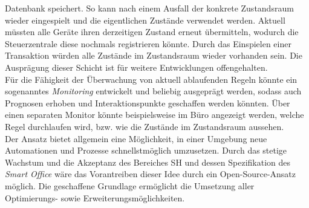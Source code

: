    Datenbank speichert. So kann nach einem Ausfall der konkrete Zustandsraum wieder eingespielt und die eigentlichen Zustände verwendet werden. Aktuell müssten alle Geräte ihren derzeitigen Zustand erneut übermitteln, wodurch 
    die Steuerzentrale diese nochmals registrieren könnte. Durch das Einspielen einer Transaktion würden alle Zustände im Zustandsraum wieder vorhanden sein. Die Ausprägung dieser Schicht ist für weitere Entwicklungen offengehalten. 
    \\
    \linebreak
    Für die Fähigkeit der Überwachung von aktuell ablaufenden Regeln könnte ein sogenanntes \textit{Monitoring} entwickelt und beliebig ausgeprägt werden, sodass auch Prognosen erhoben und Interaktionspunkte geschaffen 
    werden könnten. Über einen separaten Monitor könnte beispielsweise im Büro angezeigt werden, welche Regel durchlaufen wird, bzw. wie die Zustände im Zustandsraum aussehen. 
    \\
    \linebreak
    Der Ansatz bietet allgemein eine Möglichkeit, in einer Umgebung neue Automationen und Prozesse schnellstmöglich umzusetzen. Durch das stetige Wachstum und die Akzeptanz des Bereiches \acl{SH} und dessen Spezifikation des 
    \textit{Smart Office} wäre das Vorantreiben dieser Idee durch ein Open-Source-Ansatz möglich. Die geschaffene Grundlage ermöglicht die Umsetzung aller Optimierungs- sowie Erweiterungsmöglichkeiten. 
